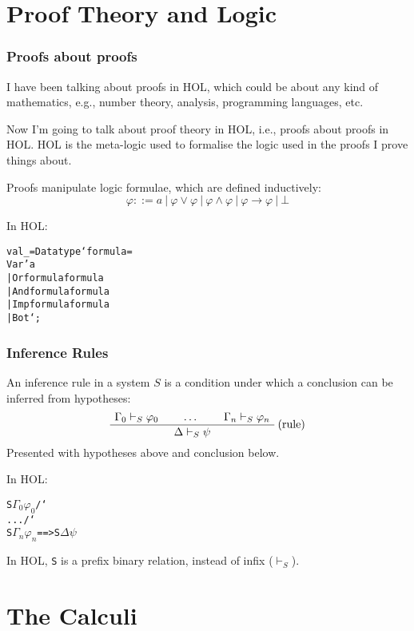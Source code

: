 \documentclass[english,svgnames,hide notes,12pt]{beamer}
\theoremstyle{definition}
\theoremstyle{remark}
\begin{document}
\section{Proof Theory and Logic}

\begin{frame}
    \frametitle{Proofs about proofs}
    I have been talking about proofs in HOL, which could be about any kind of mathematics, e.g., number theory, analysis, programming languages, etc. 
    
    \bigskip
    Now I'm going to talk about proof theory in HOL, i.e., proofs about proofs in HOL. HOL is the meta-logic used to formalise the logic used in the proofs I prove things about.  
\end{frame}

\begin{frame}[fragile]
    Proofs manipulate logic formulae, which are defined inductively:
    \[ \varphi ::= a~|~\varphi \lor \varphi~|~\varphi \land \varphi~|~\varphi \to \varphi~|~\bot \]

    \bigskip
    In HOL:
    \small
\begin{alltt}
val _ = Datatype `formula =
    Var 'a
    | Or formula formula
    | And formula formula
    | Imp formula formula
    | Bot`;
\end{alltt}
\end{frame}

\newcommand{\bs}{\char`\\}
\begin{frame}[fragile]
    \frametitle{Inference Rules}
    An inference rule in a system $S$ is a condition under which a conclusion can be inferred from hypotheses:
    \[
        \AxiomC{$\Gamma_0 \vdash_S \varphi_0$}
        \AxiomC{$\dots$}
        \AxiomC{$\Gamma_n \vdash_S \varphi_n$}  
        \RightLabel{(rule)}
        \TrinaryInfC{$\Delta \vdash_S \psi$}
        \DisplayProof
    \]
    Presented with hypotheses above and conclusion below.

    \bigskip
    In HOL:
    \begin{alltt}
        S \(\Gamma_0\) \(\varphi_0\) /\bs{} ... /\bs{} S \(\Gamma_n\) \(\varphi_n\) ==> S \(\Delta\) \(\psi\)
    \end{alltt}

    In HOL, \texttt{S} is a prefix binary relation, instead of infix ($\vdash_S$).
\end{frame}

\section{The Calculi}
\end{document}
